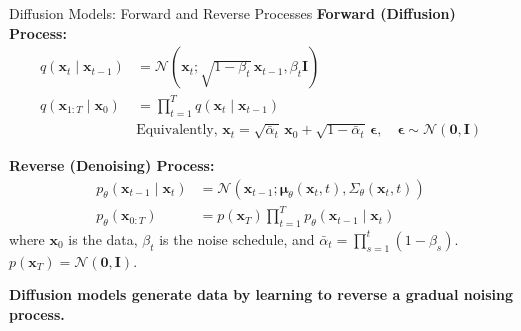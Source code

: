   \begin{refsection}
  \begin{frame}{Diffusion Models: Forward and Reverse Processes}
    \footnotesize
    \textbf{Forward (Diffusion) Process:}
    \begin{align*}
      q(\mathbf{x}_t \mid \mathbf{x}_{t-1}) &= \mathcal{N}(\mathbf{x}_t; \sqrt{1-\beta_t}\,\mathbf{x}_{t-1}, \beta_t \mathbf{I}) \\
      q(\mathbf{x}_{1:T} \mid \mathbf{x}_0) &= \prod_{t=1}^T q(\mathbf{x}_t \mid \mathbf{x}_{t-1}) \\
      &\text{Equivalently,  } 
      \mathbf{x}_t = \sqrt{\bar{\alpha}_t}\,\mathbf{x}_0 + \sqrt{1-\bar{\alpha}_t}\,\boldsymbol{\epsilon}, \quad \boldsymbol{\epsilon} \sim \mathcal{N}(\mathbf{0}, \mathbf{I})
    \end{align*}
  
    \footnotesize
    \textbf{Reverse (Denoising) Process:}
    \begin{align*}
      p_\theta(\mathbf{x}_{t-1} \mid \mathbf{x}_t) &= \mathcal{N}(\mathbf{x}_{t-1}; \boldsymbol{\mu}_\theta(\mathbf{x}_t, t), \Sigma_\theta(\mathbf{x}_t, t)) \\
      p_\theta(\mathbf{x}_{0:T}) &= p(\mathbf{x}_T) \prod_{t=1}^T p_\theta(\mathbf{x}_{t-1} \mid \mathbf{x}_t)
    \end{align*}
    \scriptsize
    where $\mathbf{x}_0$ is the data, $\beta_t$ is the noise schedule, and $\bar{\alpha}_t = \prod_{s=1}^t (1-\beta_s)$. $p(\mathbf{x}_T) = \mathcal{N}(\mathbf{0}, \mathbf{I})$.
  
    \scriptsize
    \textbf{Diffusion models generate data by learning to reverse a gradual noising process.}~\parencite{sohl2015deep,ho2020denoising}
    \bottomleftrefs
  \end{frame}
  \end{refsection}
  
